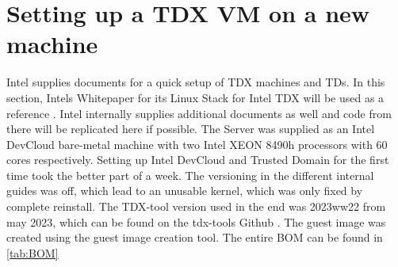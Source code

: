 \label{performance}

\section{Setting up a TDX VM on a new machine}
\label{ch:SettingUpTDX}
Intel supplies documents for a quick setup of TDX machines and TDs. In this section, Intels Whitepaper for its Linux Stack for Intel TDX will be used as a reference \cite{noauthor_white_nodate}. Intel internally supplies additional documents as well and code from there will be replicated here if possible. The Server was supplied as an Intel DevCloud bare-metal machine with two Intel XEON 8490h processors with 60 cores respectively. Setting up Intel DevCloud and Trusted Domain for the first time took the better part of a week. The versioning in the different internal guides was off, which lead to an unusable kernel, which was only fixed by complete reinstall. The TDX-tool version used in the end was 2023ww22 from may 2023, which can be found on the tdx-tools Github \cite{intel_corporation_inteltdx-tools_2024}. The guest image was created using the guest image creation tool. The entire BOM can be found in \cref{tab:BOM}

